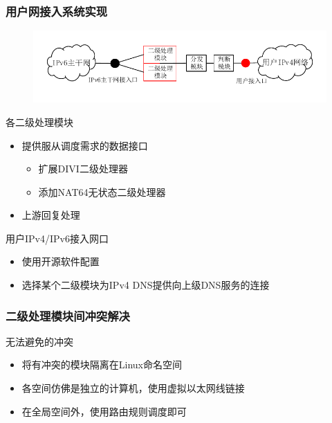 \documentclass{beamer}
\begin{document}
\begin{frame}
  \frametitle{用户网接入系统实现}
  \vspace{-1em}
  \begin{figure}
    \includegraphics[width=\textwidth]{figs/10-user-access-point-d.pdf}
  \end{figure}
  \vspace{-2em}

  \begin{block}{各二级处理模块}
    \begin{itemize}
    \item 提供服从调度需求的数据接口
      \begin{itemize}
      \item 扩展DIVI二级处理器
      \item 添加NAT64无状态二级处理器
      \end{itemize}
    \item 上游回复处理
    \end{itemize}
  \end{block}

  \begin{block}{用户IPv4/IPv6接入网口}
    \begin{itemize}
    \item 使用开源软件配置
    \item 选择某个二级模块为IPv4 DNS提供向上级DNS服务的连接
    \end{itemize}
  \end{block}
\end{frame}

\begin{frame}
  \frametitle{二级处理模块间冲突解决}

  \begin{block}{无法避免的冲突}
    \begin{itemize}
    \item 将有冲突的模块隔离在Linux命名空间
    \item 各空间仿佛是独立的计算机，使用虚拟以太网线链接
    \item 在全局空间外，使用路由规则调度即可
    \end{itemize}
  \end{block}
\end{frame}
\end{document}

